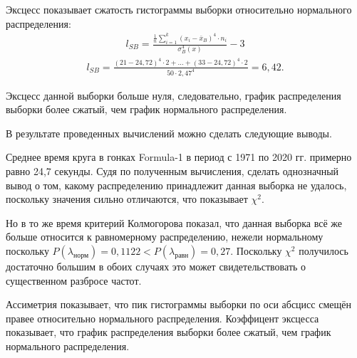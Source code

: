 \documentclass[utf8, a4paper, 14pt, russian, oneside]{book}
\begin{document}
Эксцесс показывает сжатость гистограммы выборки относительно нормального распределения:
\begin{align*}
    l_{SB} = \frac{
        \frac{1}{n} \sum_{i=1}^{k}(x_i - \overline{x}_B)^4 \cdot n_i
    }{\sigma_B^4(x)}
    - 3
\end{align*}
\begin{align*}
    l_{SB} = \frac{(21 - 24,72)^4 \cdot 2 + \ldots + (33 - 24,72)^4 \cdot 2}{50 \cdot 2,47^4} = 6,42.
\end{align*}

Эксцесс данной выборки больше нуля, следовательно, график распределения выборки более сжатый, чем график нормального распределения.

\newpage

В результате проведенных вычислений можно сделать следующие выводы.

Среднее время круга в гонках Formula-1 в период с 1971 по 2020 гг. примерно равно 24,7 секунды. Судя по полученным вычисления, сделать однозначный вывод
о том, какому распределению принадлежит данная выборка не удалось, поскольку значения сильно отличаются, что показывает $\chi^2$.

Но в то же время критерий Колмогорова показал, что данная выборка всё же больше относится к равномерному распределению, нежели нормальному поскольку
$P(\lambda_{норм}) = 0,1122 < P(\lambda_{\text{равн}}) = 0,27$. Поскольку $\chi^2$ получилось достаточно большим в обоих случаях это может свидетельствовать 
о существенном разбросе частот.

Ассиметрия показывает, что пик гистограммы выборки по оси абсцисс смещён правее относительно нормального распределения.
Коэффицент эксцесса показывает, что график распределения выборки более сжатый, чем график нормального распределения.
\end{document}
